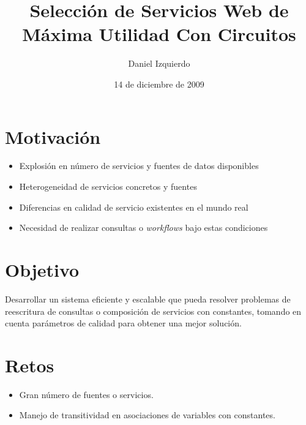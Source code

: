 \documentclass{beamer}
\title{Selección de Servicios Web de Máxima Utilidad Con Circuitos}
\author{Daniel Izquierdo}
\date{14 de diciembre de 2009}
\begin{document}
\frame{\titlepage}


\section[Contenido]{}
\frame{\tableofcontents}


\frame
{
\section{Motivación}

\begin{itemize}
\item Explosión en número de servicios y fuentes de datos disponibles
\item Heterogeneidad de servicios concretos y fuentes
\item Diferencias en calidad de servicio existentes en el mundo real
    \item Necesidad de realizar consultas o \emph{workflows} bajo estas condiciones
\end{itemize}
}


\frame
{
\section{Objetivo}
Desarrollar un sistema eficiente y escalable que pueda resolver problemas de
reescritura de consultas o composición de servicios con constantes, tomando en
cuenta parámetros de calidad para obtener una mejor solución.
}


\frame
{
\section{Retos}
\begin{itemize}
\item Gran número de fuentes o servicios.
\item Manejo de transitividad en asociaciones de variables con constantes.
\end{itemize}
}
\end{document}

